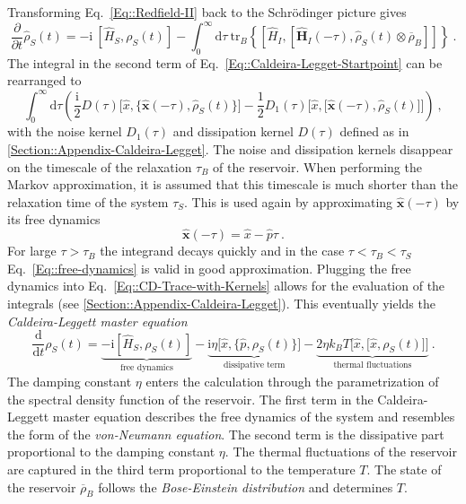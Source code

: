 	Transforming Eq.~\eqref{Eq::Redfield-II} back to the Schrödinger picture gives
	\begin{equation} \label{Eq::Caldeira-Legget-Startpoint}
		\frac{\partial}{\partial t} {\hat{\rho}}_S(t) =	-\mathrm{i}~\left[\hat{H}_S, \rho_S(t)\right] - \int_{0}^{\infty} \text{d}\tau~ \text{tr}_B \left\{  \left[{\hat{H}}_I, \left[{\boldsymbol{\hat{H}}}_I(- \tau), {\hat{\rho}}_S(t) \otimes \overline{\rho}_B \right]\right]  \right\}~.
	\end{equation}
	The integral in the second term of Eq.~\eqref{Eq::Caldeira-Legget-Startpoint} can be rearranged to
	\begin{equation} \label{Eq::CD-Trace-with-Kernels}
		\int_{0}^{\infty} \text{d}\tau \left(\frac{\mathrm{i}}{2} D(\tau) \Big[\hat{x}, \big\{\boldsymbol{\hat{x}}(-\tau), \hat{\rho}_S(t)\big\} \Big] - \frac{1}{2} D_1(\tau) \Big[\hat{x}, \big[\boldsymbol{\hat{x}}(-\tau) , \hat{\rho}_S(t)\big]\Big]\right)~,
	\end{equation}
	with the noise kernel $D_1(\tau)$ and dissipation kernel $D(\tau)$ defined as in \autoref{Section::Appendix-Caldeira-Legget}. The noise and dissipation kernels disappear on the timescale of the relaxation $\tau_B$ of the reservoir. When performing the Markov approximation, it is assumed that this timescale is much shorter than the relaxation time of the system $\tau_S$. This is used again by approximating $\boldsymbol{\hat{x}}(-\tau)$ by its free dynamics
	\begin{equation}\label{Eq::free-dynamics}
		\boldsymbol{\hat{x}}(-\tau) =	\hat{x} - \hat{p} \tau~.
	\end{equation}
	For large $\tau > \tau_B$ the integrand decays quickly and in the case $\tau < \tau_B < \tau_S$ Eq.~\eqref{Eq::free-dynamics} is valid in good approximation. Plugging the free dynamics into Eq.~\eqref{Eq::CD-Trace-with-Kernels} allows for the evaluation of the integrals (see \autoref{Section::Appendix-Caldeira-Legget}). This eventually yields the \textit{Caldeira-Leggett master equation}
	\begin{equation} \label{Eq::Caldeira-Leggett-Master-equation}
		\frac{\text{d}}{\text{d}t} \rho_S(t) =	\underbrace{-\mathrm{i}\left[\hat{H}_S, \rho_S(t) \right]}_{\text{free dynamics}} - \underbrace{\mathrm{i} \eta \Big [\hat{x}, \big\{\hat{p}, \rho_S(t)\big\}\Big ]}_\text{dissipative term} - \underbrace{2 \eta k_B T \Big [\hat{x}, \big[\hat{x}, \rho_S(t)\big]\Big ]}_\text{thermal fluctuations}~.
	\end{equation}
	The damping constant $\eta$ enters the calculation through the parametrization of the spectral density function of the reservoir. The first term in the Caldeira-Leggett master equation describes the free dynamics of the system and resembles the form of the \textit{von-Neumann equation}. The second term is the dissipative part proportional to the damping constant $\eta$. The thermal fluctuations of the reservoir are captured in the third term proportional to the temperature $T$. The state of the reservoir $\overline{\rho}_B$ follows the \textit{Bose-Einstein distribution} and determines $T$.
